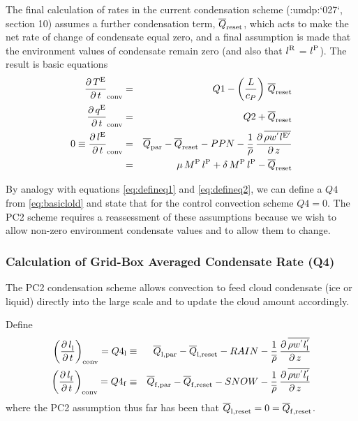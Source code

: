 \documentclass{UMDP_article}
\newcommand{\citeumdp}[1]{:umdp:`#1`}
\newcommand{\lsubsup}[2]{\ensuremath{l_{\rm{#1}}^{\rm{#2}}}}
\newcommand{\qsubsup}[2]{\ensuremath{q_{\rm{#1}}^{\rm{#2}}}}
\newcommand{\tsubsup}[2]{\ensuremath{T_{\rm{#1}}^{\rm{#2}}}}
\newcommand{\ov}{\overline}
\newcommand{\lp}{\left(}
\newcommand{\rp}{\right)}
\newcommand{\pardbyd}[2]{\ensuremath{\frac{\partial \, #1}{\partial \, #2}}}
\begin{document}
The final calculation of rates in the current condensation scheme (\citeumdp{027},
section 10) assumes a further condensation term, ${\ov{Q}}_{\rm{reset}}$, which
acts to make the net rate of change of condensate equal zero, and a final
assumption is made that the environment values of condensate remain zero (and
also that \lsubsup{ }{R} = \lsubsup{ }{P}). The
result is basic equations
%
\begin{eqnarray}
{\pardbyd{\tsubsup{ }{E}}{t}}_{\rm{conv}} & = & Q1 -
\lp { \frac{L}{c_{P}} } \rp \, {\ov{Q}}_{\rm{reset}}
\label{eq:basictold} \\ 
{\pardbyd{\qsubsup{ }{E}}{t}}_{\rm{conv}} & = & Q2 + {\ov{Q}}_{\rm{reset}}
\label{eq:basicqold} \\
0 \equiv {\pardbyd{\lsubsup{ }{E}}{t}}_{\rm{conv}} & = & {\ov{Q}}_{\rm{par}} - 
{\ov{Q}}_{\rm{reset}} - PPN
- \frac{1}{\ov{\rho}} \, \pardbyd{\ov{\rho w^{'} \lsubsup{ }{E'}}}{z} \nonumber \\
& = & 
\mu \, M^{\rm{P}} \, \lsubsup{ }{P} + \delta \, M^{\rm{P}} \, \lsubsup{ }{P} -
{\ov{Q}}_{\rm{reset}} 
\label{eq:basiclold} 
\end{eqnarray}

By analogy with equations \ref{eq:defineq1} and \ref{eq:defineq2}, we can
define a $Q4$ from \ref{eq:basiclold} and state that for the control
convection scheme $Q4 = 0$. The PC2 scheme requires a reassessment of these
assumptions because we wish to allow non-zero environment condensate values and
to allow them to change.

\subsubsection{Calculation of Grid-Box Averaged Condensate Rate (Q4)}
\label{subsect:q4calculation}

The PC2 condensation scheme allows convection to feed cloud condensate (ice or
liquid) directly into the large scale and to update the cloud amount accordingly.

Define
%
\begin{eqnarray}
\lp { \pardbyd{\lsubsup{l}{ }}{t} } \rp_{\rm{conv}} = Q4_{\rm{l}} & \equiv &  
{\ov{Q}}_{\rm{l, par}} - {\ov{Q}}_{\rm{l, reset}} - RAIN - 
\frac{1}{\ov{\rho}} \, \pardbyd{\ov{\rho w^{'} \lsubsup{l}{'}}}{z}
\label{eq:defineq4l} \\
\lp { \pardbyd{\lsubsup{f}{ }}{t} } \rp_{\rm{conv}} = Q4_{\rm{f}} & \equiv &  
{\ov{Q}}_{\rm{f, par}} - {\ov{Q}}_{\rm{f, reset}} - SNOW - 
\frac{1}{\ov{\rho}} \, \pardbyd{\ov{\rho w^{'} \lsubsup{f}{'}}}{z}
\label{eq:defineq4f}
\end{eqnarray}
%
where the PC2 assumption thus far has been that ${\ov{Q}}_{\rm{l, reset}} = 0
= {\ov{Q}}_{\rm{f, reset}}$.
\end{document}
